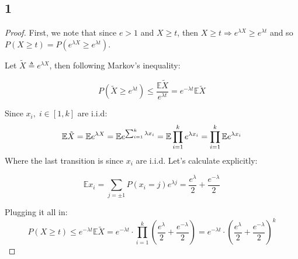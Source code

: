 \subsection*{1}
\begin{proof}    
    First, we note that since $e>1$ and $X\geq t$, then $X\geq t \Rightarrow e^{\lambda X} \geq e^{\lambda t}$
    and so $P(X\geq t) = P(e^{\lambda X} \geq e^{\lambda t})$.
    
    Let $\tilde{X} \triangleq e^{\lambda X}$, then following Markov's inequality:
    
    \begin{equation*}
        P(\tilde{X} \geq e^{\lambda t}) \leq \frac{\mathbb{E}\tilde{X}}{e^{\lambda t}} =e^{-\lambda t} \mathbb{E}\tilde{X} 
    \end{equation*}
    
    Since $x_i, \; i\in [1, k]$ are i.i.d:
    \begin{equation*}
        \mathbb{E}\tilde{X} = \mathbb{E} e^{\lambda X} = \mathbb{E} e^{\sum_{i=1}^{k} \lambda x_i} = 
        \mathbb{E} \prod_{i=1}^k e^{\lambda x_i} = \prod_{i=1}^k \mathbb{E} e^{\lambda x_i}
    \end{equation*}
    Where the last transition is since $x_i$ are i.i.d. Let's calculate explicitly:
    
    \begin{equation*}
        \mathbb{E} x_i = \sum_{j=\pm 1} P(x_i=j) e^{\lambda j} = \frac{e^\lambda}{2} + \frac{e^{-\lambda}}{2}
    \end{equation*}
    
    Plugging it all in:
    \begin{equation*}
        P(X\geq t) \leq e^{-\lambda t} \mathbb{E}\tilde{X} = 
        e^{-\lambda t}\cdot \prod_{i=1}^k \left( \frac{e^\lambda}{2} + \frac{e^{-\lambda}}{2} \right)
        = e^{-\lambda t}\cdot \left( \frac{e^\lambda}{2} + \frac{e^{-\lambda}}{2} \right)^k
    \end{equation*}
\end{proof}

